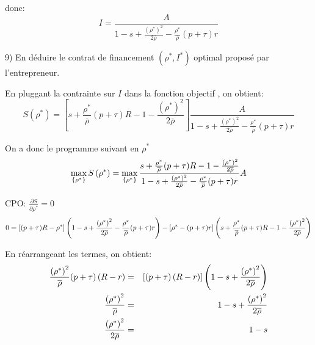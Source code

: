 \documentclass[a4paper]{article}
\begin{document}
donc:%
\begin{equation*}
I=\frac{A}{1-s+\frac{\left( \rho ^{\ast }\right) ^{2}}{2\overline{\rho }}-%
\frac{\rho ^{\ast }}{\overline{\rho }}(p+\tau )r}
\end{equation*}

\bigskip

9) En d\'{e}duire le contrat de financement $(\rho ^{\ast },I^{\ast })$
optimal propos\'{e} par l'entrepreneur.

En pluggant la contrainte sur $I$ dans la fonction objectif , on obtient:%
\begin{equation*}
S\left( \rho ^{\ast }\right) =\left[ s+\frac{\rho ^{\ast }}{\overline{\rho }}%
(p+\tau )R-1-\frac{\left( \rho ^{\ast }\right) ^{2}}{2\overline{\rho }}%
\right] \frac{A}{1-s+\frac{\left( \rho ^{\ast }\right) ^{2}}{2\overline{\rho 
}}-\frac{\rho ^{\ast }}{\overline{\rho }}(p+\tau )r}
\end{equation*}

On a donc le programme suivant en $\rho ^{\ast }$%
\begin{equation*}
\max_{\left\{ \rho ^{\ast }\right\} }S\left( \rho ^{\ast }\right)
=\max_{\left\{ \rho ^{\ast }\right\} }\frac{s+\frac{\rho ^{\ast }}{\overline{%
\rho }}(p+\tau )R-1-\frac{\left( \rho ^{\ast }\right) ^{2}}{2\overline{\rho }%
}}{1-s+\frac{\left( \rho ^{\ast }\right) ^{2}}{2\overline{\rho }}-\frac{\rho
^{\ast }}{\overline{\rho }}(p+\tau )r}A
\end{equation*}

CPO: $\frac{\partial S}{\partial \rho ^{\ast }}=0$%
\begin{equation*}
0=\left[ (p+\tau )R-\rho ^{\ast }\right] \left( 1-s+\frac{\left( \rho ^{\ast
}\right) ^{2}}{2\overline{\rho }}-\frac{\rho ^{\ast }}{\overline{\rho }}%
(p+\tau )r\right) -\left[ \rho ^{\ast }-(p+\tau )r\right] \left( s+\frac{%
\rho ^{\ast }}{\overline{\rho }}(p+\tau )R-1-\frac{\left( \rho ^{\ast
}\right) ^{2}}{2\overline{\rho }}\right)
\end{equation*}

En r\'{e}arrangeant les termes, on obtient:%
\begin{eqnarray*}
\frac{\left( \rho ^{\ast }\right) ^{2}}{\overline{\rho }}(p+\tau )\left(
R-r\right) &=&\left[ (p+\tau )\left( R-r\right) \right] \left( 1-s+\frac{%
\left( \rho ^{\ast }\right) ^{2}}{2\overline{\rho }}\right) \\
\frac{\left( \rho ^{\ast }\right) ^{2}}{\overline{\rho }} &=&1-s+\frac{%
\left( \rho ^{\ast }\right) ^{2}}{2\overline{\rho }} \\
\frac{\left( \rho ^{\ast }\right) ^{2}}{2\overline{\rho }} &=&1-s
\end{eqnarray*}
\end{document}
